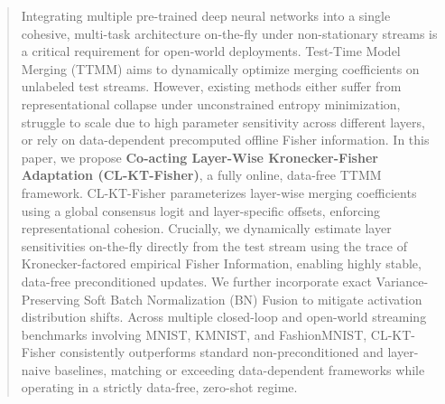 \documentclass{article}
\theoremstyle{plain}
\theoremstyle{definition}
\theoremstyle{remark}
\begin{document}

\printAffiliationsAndNotice{}

\begin{abstract}
Integrating multiple pre-trained deep neural networks into a single cohesive, multi-task architecture on-the-fly under non-stationary streams is a critical requirement for open-world deployments. Test-Time Model Merging (TTMM) aims to dynamically optimize merging coefficients on unlabeled test streams. However, existing methods either suffer from representational collapse under unconstrained entropy minimization, struggle to scale due to high parameter sensitivity across different layers, or rely on data-dependent precomputed offline Fisher information. In this paper, we propose \textbf{Co-acting Layer-Wise Kronecker-Fisher Adaptation (CL-KT-Fisher)}, a fully online, data-free TTMM framework. CL-KT-Fisher parameterizes layer-wise merging coefficients using a global consensus logit and layer-specific offsets, enforcing representational cohesion. Crucially, we dynamically estimate layer sensitivities on-the-fly directly from the test stream using the trace of Kronecker-factored empirical Fisher Information, enabling highly stable, data-free preconditioned updates. We further incorporate exact Variance-Preserving Soft Batch Normalization (BN) Fusion to mitigate activation distribution shifts. Across multiple closed-loop and open-world streaming benchmarks involving MNIST, KMNIST, and FashionMNIST, CL-KT-Fisher consistently outperforms standard non-preconditioned and layer-naive baselines, matching or exceeding data-dependent frameworks while operating in a strictly data-free, zero-shot regime.
\end{abstract}
\end{document}
